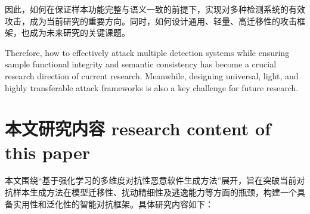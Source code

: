 因此，如何在保证样本功能完整与语义一致的前提下，实现对多种检测系统的有效攻击，成为当前研究的重要方向。同时，如何设计通用、轻量、高迁移性的攻击框架，也成为未来研究的关键课题。

Therefore, how to effectively attack multiple detection systems while ensuring sample functional integrity and semantic consistency has become a crucial research direction of current research. Meanwhile, designing universal, light, and highly transferable attack frameworks is also a key challenge for future research.

\section{本文研究内容 research content of this paper}

本文围绕“基于强化学习的多维度对抗性恶意软件生成方法”展开，旨在突破当前对抗样本生成方法在模型迁移性、扰动精细性及逃逸能力等方面的瓶颈，构建一个具备实用性和泛化性的智能对抗框架。具体研究内容如下：

